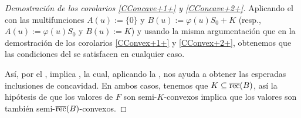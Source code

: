 \begin{proof}[Demostraci\'on de los corolarios \ref{CConcave+1+} y \ref{CConcave+2+}]
	Aplicando el  con las multifunciones  
	$A(u):=\{0\}$ y $B(u):=\varphi(u)S_0+K$ (resp., $A(u):=\varphi(u)S_0$ y $B(u):=K$)
	y usando la misma argumentaci\'on que en la demostraci\'on de los corolarios
	\ref{CConvex+1+} y \ref{CConvex+2+}, obtenemos que las condiciones del 
	se satisfacen en cualquier caso.
	
	As\'i, por el ,  implica , la cual, aplicando
	la , nos ayuda a obtener las esperadas inclusiones de concavidad. En ambos
	casos, tenemos que $K\subseteq\overline{\mathop{\hbox{\rm rec}}\nolimits}(B)$, as\'i la hip\'otesis de que los valores
	de $F$ son semi-$K$-convexos implica que los valores son tambi\'en 
	semi-$\overline{\mathop{\hbox{\rm rec}}\nolimits}(B)$-convexos.
\end{proof}

